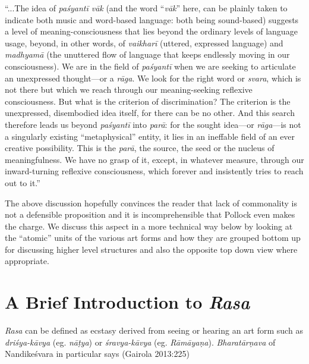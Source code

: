 \begin{myquote}
“...The idea of \textsl{paśyantī vāk} (and the word “\textsl{vāk}” here, can be plainly taken to indicate both music and word-based language: both being sound-based) suggests a level of meaning-consciousness that lies beyond the ordinary levels of language usage, beyond, in other words, of \textsl{vaikharī} (uttered, expressed language) and \textsl{madhyamā} (the unuttered flow of language that keeps endlessly moving in our consciousness). We are in the field of \textsl{paśyantī} when we are seeking to articulate an unexpressed thought---or a \textsl{rāga}. We look for the right word or \textsl{svara}, which is not there but which we reach through our meaning-seeking reflexive consciousness. But what is the criterion of discrimination? The criterion is the unexpressed, disembodied idea itself, for there can be no other. And this search therefore leads us beyond \textsl{paśyantī} into \textsl{parā}: for the sought idea---or \textsl{rāga}---is not a singularly existing “metaphysical” entity, it lies in an ineffable field of an ever creative possibility. This is the \textsl{parā}, the source, the seed or the nucleus of meaningfulness. We have no grasp of it, except, in whatever measure, through our inward-turning reflexive consciousness, which forever and insistently tries to reach out to it.”
\end{myquote}

The above discussion hopefully convinces the reader that lack of commonality is not a defensible proposition and it is incomprehensible that Pollock even makes the charge. We discuss this aspect in a more technical way below by looking at the “atomic” units of the various art forms and how they are grouped bottom up for discussing higher level structures and also the opposite top down view where appropriate.

\section{A Brief Introduction to \textsl{Rasa}}\label{chap3-sec2}

\textsl{Rasa} can be defined as ecstasy derived from seeing or hearing an art form such as \textsl{driśya-kāvya} (eg. \textsl{nāṭya}) or \textsl{śravya-kāvya} (eg. \textsl{Rāmāyaṇa}). \textsl{Bharatārṇava} of Nandikeśvara in particular says (Gairola 2013:225)

